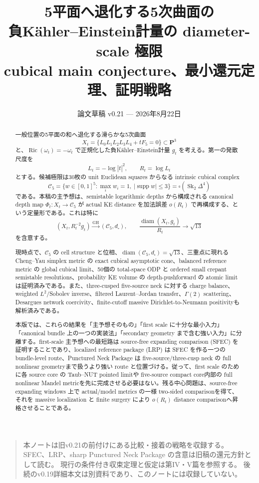 \documentclass[11pt,a4paper]{ltjsarticle}
\title{\bfseries 5平面へ退化する5次曲面の\\
負Kähler--Einstein計量の diameter-scale 極限\\[3mm]
\large cubical main conjecture、最小還元定理、証明戦略}
\author{}
\date{論文草稿 v0.21 --- 2026年8月22日}
\newcommand{\PP}{\mathbf P}
\newcommand{\cC}{\mathcal C}
\newcommand{\Sk}{\operatorname{Sk}}
\newcommand{\diam}{\operatorname{diam}}
\newcommand{\Ric}{\operatorname{Ric}}
\newcommand{\GH}{\mathrm{GH}}
\newcommand{\supp}{\operatorname{supp}}
\theoremstyle{plain}
\theoremstyle{definition}
\theoremstyle{remark}
\begin{document}
\maketitle
\begin{quote}
本ノートは旧v0.21の前付けにある比較・接着の戦略を収録する。
SFEC、LRP、sharp Punctured Neck Package の含意は旧稿の還元方針として読む。
現行の条件付き収束定理と仮定は第IV・V篇を参照する。
後続のv0.19詳細本文は別資料であり、このノートには収録していない。
\end{quote}

\begin{abstract}
一般位置の5平面の和へ退化する滑らかな5次曲面
\[
 X_t=\{L_0L_1L_2L_3L_4+tF_5=0\}\subset\PP^3
\]
と、$\Ric(\omega_t)=-\omega_t$ で正規化した負Kähler--Einstein計量 $g_t$ を考える。第一の発散尺度を
\[
 L_t=-\log|t|^2,\qquad R_t=\log L_t
\]
とする。候補極限は30枚の unit Euclidean squares からなる intrinsic cubical complex
\[
 \cC_5=\{w\in[0,1]^5:\max_iw_i=1,\ |\supp w|\le3\}
       =\square(\Sk_2\Delta^4)
\]
である。本稿の主予想は、semistable logarithmic depths から構成される canonical depth map
$\Phi_t:X_t\to\cC_5$ が actual KE distance を加法誤差 $o(R_t)$ で再構成する、という定量形である。これは特に
\[
 (X_t,R_t^{-2}g_t)\xrightarrow{\GH}(\cC_5,d_\square),
 \qquad
 \frac{\diam(X_t,g_t)}{R_t}\longrightarrow\sqrt{13}
\]
を含意する。

現時点で、$\cC_5$ の cell structure と位相、$\diam(\cC_5,d_\square)=\sqrt{13}$、三重点に現れる Cheng--Yau simplex metric の exact cubical asymptotic cone、balanced reference metric の global cubical limit、50個の total-space ODP と ordered small crepant semistable resolutions、probability KE volume の depth-pushforward の atomic limitは証明済みである。また、three-cusped five-source neck に対する charge balance、weighted $L^2$/Sobolev inverse、filtered Laurent--Jordan transfer、$\Gamma(2)$ scattering、Desargues network coercivity、finite-cutoff massive Dirichlet-to-Neumann positivityも解析済みである。

本版では、これらの結果を「主予想そのもの」「first scale に十分な最小入力」「canonical bundle 上の一つの実装法」「secondary geometry まで含む強い入力」に分離する。first-scale 主予想への最短路は source-free expanding comparison (SFEC) を証明することであり、localized reference package (LRP) は SFEC を作る一つの bundle-level route、Punctured Neck Package は five-source/three-cusp neck の full nonlinear geometryまで扱うより強い route と位置づける。従って、first scale のために各 source core の Taub--NUT pointed limitや five-source compact core内部の full nonlinear Mandel metricを先に完成させる必要はない。残る中心問題は、source-free expanding windows 上で actual/model metrics の一様 two-sided comparisonを得て、それを massive localization と finite surgery により $o(R_t)$ distance comparisonへ昇格させることである。
\end{abstract}
\end{document}
